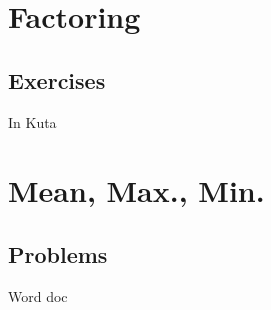 \section{Factoring}
\noindent{}

\newpage
\subsection{Exercises}
In Kuta



\newpage
\section{Mean, Max., Min.}
\subsection{Problems}
Word doc
\newpage

\newpage
